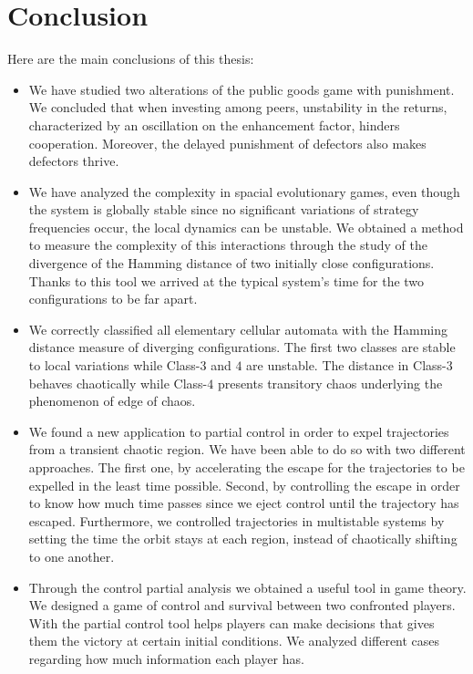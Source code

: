 \chapter{Conclusion}
\label{chap:Conclusion}

\vspace{-2cm}

Here are the main conclusions of this thesis:

\begin{itemize}

\item We have studied two alterations of the public goods game with punishment. We concluded that when investing among peers, unstability in the returns, characterized by an oscillation on the enhancement factor, hinders cooperation. Moreover, the delayed punishment of defectors also makes defectors thrive.


\item We have analyzed the complexity in spacial evolutionary games, even though the system is globally stable since no significant variations of strategy frequencies occur, the local dynamics can be unstable. We obtained a method to measure the complexity of this interactions through the study of the divergence of the Hamming distance of two initially close configurations. Thanks to this tool we arrived at the typical system's time for the two configurations to be far apart.

\item We correctly classified all elementary cellular automata with the Hamming distance measure of diverging configurations. The first two classes are stable to local variations while Class-$3$ and $4$ are unstable. The distance in Class-$3$ behaves chaotically while Class-$4$ presents transitory chaos underlying the phenomenon of edge of chaos.

\item We found a new application to partial control in order to expel trajectories from a transient chaotic region. We have been able to do so with two different approaches. The first one, by accelerating the escape for the trajectories to be expelled in the least time possible. Second, by controlling the escape in order to know how much time passes since we eject control until the trajectory has escaped. Furthermore, we controlled trajectories in multistable systems by setting the time the orbit stays at each region, instead of chaotically shifting to one another.

\item Through the control partial analysis we obtained a useful tool in game theory. We designed a game of control and survival between two confronted players. With the partial control tool helps players can make decisions that gives them the victory at certain initial conditions. We analyzed different cases regarding how much information each player has.

\end{itemize}


